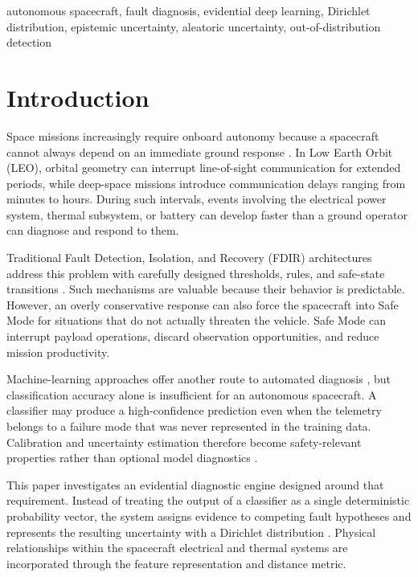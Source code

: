 \documentclass[conference]{IEEEtran}
\begin{document}
\begin{IEEEkeywords}
autonomous spacecraft, fault diagnosis, evidential deep learning, Dirichlet distribution, epistemic uncertainty, aleatoric uncertainty, out-of-distribution detection
\end{IEEEkeywords}

\section{Introduction}

Space missions increasingly require onboard autonomy because a spacecraft cannot always depend on an immediate ground response \cite{chien2005autonomous}. In Low Earth Orbit (LEO), orbital geometry can interrupt line-of-sight communication for extended periods, while deep-space missions introduce communication delays ranging from minutes to hours. During such intervals, events involving the electrical power system, thermal subsystem, or battery can develop faster than a ground operator can diagnose and respond to them.

Traditional Fault Detection, Isolation, and Recovery (FDIR) architectures address this problem with carefully designed thresholds, rules, and safe-state transitions \cite{muscettola1998remote, williams1996model}. Such mechanisms are valuable because their behavior is predictable. However, an overly conservative response can also force the spacecraft into Safe Mode for situations that do not actually threaten the vehicle. Safe Mode can interrupt payload operations, discard observation opportunities, and reduce mission productivity.

Machine-learning approaches offer another route to automated diagnosis \cite{hundman2018detecting}, but classification accuracy alone is insufficient for an autonomous spacecraft. A classifier may produce a high-confidence prediction even when the telemetry belongs to a failure mode that was never represented in the training data. Calibration and uncertainty estimation therefore become safety-relevant properties rather than optional model diagnostics \cite{guo2017calibration, hendrycks2017baseline}.

This paper investigates an evidential diagnostic engine designed around that requirement. Instead of treating the output of a classifier as a single deterministic probability vector, the system assigns evidence to competing fault hypotheses and represents the resulting uncertainty with a Dirichlet distribution \cite{sensoy2018evidential, malinin2018predictive}. Physical relationships within the spacecraft electrical and thermal systems are incorporated through the feature representation and distance metric.
\end{document}
